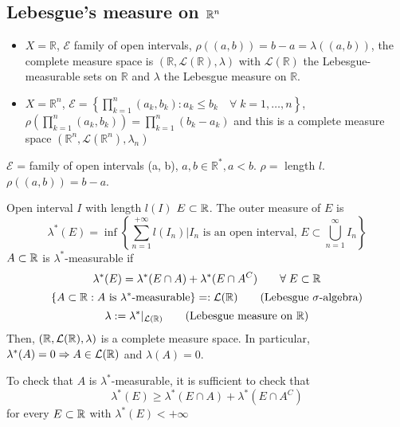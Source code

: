 \subsection{Lebesgue's measure on \texorpdfstring{\(\mathbb{R}^n\)}{Rn}}
\begin{itemize}
\item \(X = \mathbb{R}\), \(\mathcal{E}\) family of open intervals, \(\rho((a,b)) = b-a = \lambda((a,b))\), the complete measure space is \((\mathbb{R}, \mathcal{L}(\mathbb{R}), \lambda)\) with \(\mathcal{L}(\mathbb{R})\) the Lebesgue-measurable sets on \(\mathbb{R}\) and \(\lambda\) the Lebesgue measure on \(\mathbb{R}\).
\item \(X = \mathbb{R}^n\), \(\mathcal{E} = \left\lbrace \prod_{k = 1}^n (a_k, b_k): a_k \leq b_k \quad \forall \; k = 1,\ldots, n \right\rbrace\), \(\rho\left(\prod_{k = 1}^n (a_k, b_k)\right) = \prod_{k=1}^n (b_k - a_k)\) and this is a complete measure space \((\mathbb{R}^n, \mathcal{L}(\mathbb{R}^n), \lambda_n)\)
\end{itemize}
\begin{notation}
    \(\mathcal{E}\) = family of open intervals (a, b), \(a,b \in \mathbb{R}^*, a < b\). \(\rho =\) length \(l\).
    \(\rho((a,b)) = b - a\). 

    Open interval \(I\) with length \(l(I)\)
    \(E \subset \mathbb{R}\). The outer measure of \(E\) is 
    \[
        \lambda^*(E) = \inf \left\lbrace \sum_{n=1}^{+\infty} l(I_n) \vert I_n \mbox{ is an open interval, } E \subset \bigcup_{n = 1}^{\infty} I_n \right\rbrace
    \]
    \(A \subset \mathbb{R}\) is \(\lambda^*\)-measurable if 
    \[
        \lambda^*(E) = \lambda^*(E \cap A) + \lambda^*(E \cap A^C) \qquad \forall \; E \subset \mathbb{R}
    \]
    \[
        \left\lbrace A \subset \real : A \mbox{ is }\lambda^*\mbox{-measurable} \right\rbrace =: \mathcal{L}(\real)
    \tag*{(Lebesgue \(\sigalg\))}\]
    \[
        \lambda := \lambda^* \vert_{\mathcal{L}(\real)}
    \tag*{(Lebesgue measure on \(\real\))}\]
    Then, \((\mathbb{R}, \mathcal{L}(\mathbb{R}), \lambda)\) is a complete measure space. In particular, \(\lambda^*(A) = 0 \Rightarrow A \in \mathcal{L}(\mathbb{R})\) and \(\lambda(A) = 0\).
\end{notation}
\begin{remark}
    To check that \(A\) is \(\lambda^*\)-measurable, it is sufficient to check that 
    \[
        \lambda^* (E)\geq \lambda^*(E \cap A) + \lambda^*(E \cap A^C)
    \] for every \(E \subset \mathbb{R}\) with \(\lambda^*(E) < +\infty\)
\end{remark}
